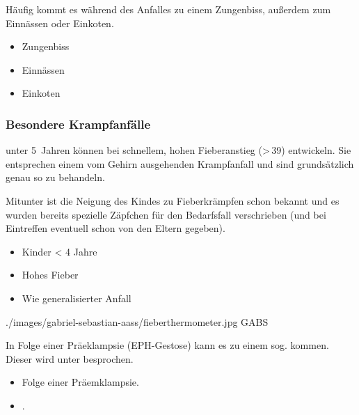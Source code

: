 {%
Häufig kommt es während des Anfalles zu einem Zungenbiss,
außerdem zum Einnässen oder Einkoten.
}{
\begin{itemize}
  \item Zungenbiss
  \item Einnässen
  \item Einkoten
\end{itemize}
}{}{}{}



\subsubsection{Besondere Krampfanfälle}

{%
\label{topic:fieberkrampf}%
%
%
%
 unter 5~Jahren können bei schnellem, hohen
Fieberanstieg ({\textgreater}\,39{\DegC}) 
 entwickeln. Sie entsprechen einem vom
Gehirn ausgehenden Krampfanfall und sind grundsätzlich genau
so zu behandeln.

Mitunter ist die Neigung des Kindes zu Fieberkrämpfen schon
bekannt und es wurden bereits spezielle Zäpfchen für den
Bedarfsfall verschrieben (und bei Eintreffen eventuell schon
von den Eltern gegeben).
}{
\begin{itemize}
  \item Kinder {\textless} 4 Jahre
  \item Hohes Fieber
  \item Wie generalisierter Anfall
\end{itemize}
}
{./images/gabriel-sebastian-aass/fieberthermometer.jpg}
{}
{GABS}



{%
In Folge einer Präeklampsie (EPH-Gestose)
kann es zu einem sog. 
kommen. Dieser wird unter 
besprochen.
}{
\begin{itemize}
    \item Folge einer Präemklampsie.
    \item {}.
\end{itemize}
}{}{}{}


